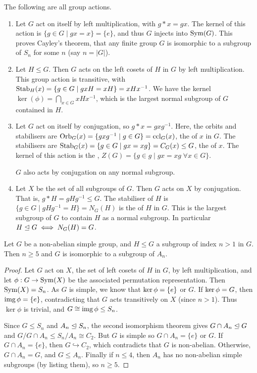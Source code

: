 \documentclass[a4paper]{scrreprt}
\begin{document}
\begin{example}
	The following are all group actions.
	\begin{enumerate}[label=(\roman*)]
		\item Let $G$ act on itself by left multiplication, with $g * x = gx$. The kernel of this action is $\{g \in G \mid gx = x \} = \{e\}$, and thus $G$ injects into $\operatorname{Sym}(G)$. This proves Cayley's theorem, that any finite group $G$ is isomorphic to a subgroup of $S_n$ for some $n$ (say $n = |G|$).
		\item Let $H \leq G$. Then $G$ acts on the left cosets of $H$ in $G$ by left multiplication. This group action is transitive, with $\operatorname{Stab}_H(x) = \{ g \in G \mid gxH = xH \} = xHx^{-1}$. We have the kernel $\ker(\phi) = \bigcap_{x \in G} xHx^{-1}$, which is the largest normal subgroup of $G$ contained in $H$.
		\item Let $G$ act on itself by conjugation, so $g * x = gxg^{-1}$. Here, the orbits and stabilisers are $\operatorname{Orb}_G(x) = \{ gxg^{-1} \mid g \in G \} = \operatorname{ccl}_G(x)$, the  of $x$ in $G$. The stabilisers are $\operatorname{Stab}_G(x) = \{ g \in G \mid gx = xg \} = C_G(x) \leq G$, the  of $x$. The kernel of this action is the , $Z(G) = \{ g \in g \mid gx = xg \; \forall x \in G \}$.
		
		$G$ also acts by conjugation on any normal subgroup.

		\item Let $X$ be the set of all subgroups of $G$. Then $G$ acts on $X$ by conjugation. That is, $g * H = g H g^{-1} \leq G$. The stabiliser of $H$ is $\{g \in G \mid gHg^{-1} = H \} = N_G(H)$ is the  of $H$ in $G$. This is the largest subgroup of $G$ to contain $H$ as a normal subgroup. In particular $H \trianglelefteq G \iff N_G(H) = G$. 
	\end{enumerate}
\end{example}

\begin{theorem}
	Let $G$ be a non-abelian simple group, and $H\leq G$ a subgroup of index $n > 1$ in $G$. Then $n \geq 5$ and $G$ is isomorphic to a subgroup of $A_n$.
\end{theorem}
\begin{proof}
	Let $G$ act on $X$, the set of left cosets of $H$ in $G$, by left multiplication, and let $\phi: G \rightarrow \operatorname{Sym}(X)$ be the associated permutation representation. Then $\operatorname{Sym}(X) = S_n$. As $G$ is simple, we know that $\operatorname{ker} \phi = \{e\}$ or $G$. If $\operatorname{ker} \phi = G$, then $\operatorname{img} \phi = \{e\}$, contradicting that $G$ acts transitively on $X$ (since $n > 1$). Thus $\ker \phi$ is trivial, and $G \cong \operatorname{img} \phi \leq S_n$.

	Since $G \leq S_n$ and $A_n \trianglelefteq S_n$, the second isomorphism theorem gives $G \cap A_n \trianglelefteq G$ and $G / G \cap A_n \leq S_n / A_n \cong C_2$. But $G$ is simple so $G \cap A_n = \{e\}$ or $G$. If $G \cap A_n = \{e\}$, then $G \hookrightarrow C_2$, which contradicts that $G$ is non-abelian. Otherwise, $G \cap A_n = G$, and $G \leq A_n$. Finally if $n \leq 4$, then $A_n$ has no non-abelian simple subgroups (by listing them), so $n \geq 5$.
\end{proof}
\end{document}
